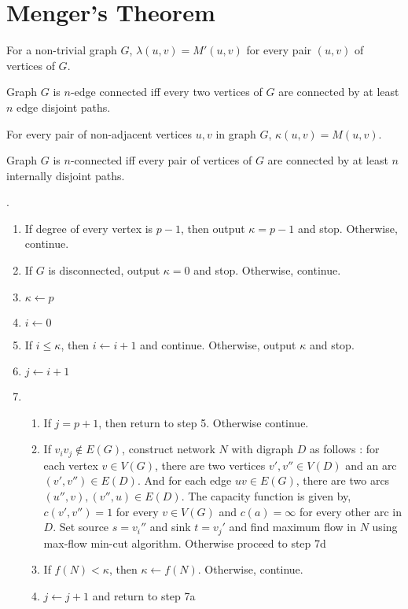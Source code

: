 \section{Menger's Theorem}
\begin{theorem}
	For a non-trivial graph $G$, $\lambda(u,v) = M'(u,v)$ for every pair $(u,v)$ of vertices of $G$.
\end{theorem}
\begin{corollary}
	Graph $G$ is $n$-edge connected iff every two vertices of $G$ are connected by at least $n$ edge disjoint paths.
\end{corollary}

\begin{theorem}
	For every pair of non-adjacent vertices $u,v$ in graph $G$, $\kappa(u,v) = M(u,v)$.
\end{theorem}
\begin{corollary}
	Graph $G$ is $n$-connected iff every pair of vertices of $G$ are connected by at least $n$ internally disjoint paths.
\end{corollary}

\begin{algorithm}.
	\begin{enumerate}
		\item If degree of every vertex is $p-1$, then output $\kappa = p-1$ and stop. Otherwise, continue.
		\item If $G$ is disconnected, output $\kappa = 0$ and stop. Otherwise, continue.
		\item $\kappa \leftarrow p$
		\item $i \leftarrow 0$
		\item If $i \le \kappa$, then $i \leftarrow i+1$ and continue. Otherwise, output $\kappa$ and stop.
		\item $j \leftarrow i+1$
		\item 
			\begin{enumerate}[label=(\arabic*)]
				\item If $j = p+1$, then return to step 5. Otherwise continue.
				\item If $v_iv_j \not\in E(G)$, construct network $N$ with digraph $D$ as follows : for each vertex $ v \in V(G)$, there are two vertices $v',v'' \in V(D)$ and an arc $(v',v'') \in E(D)$. And for each edge $uv \in E(G)$, there are two arcs $(u'',v),(v'',u) \in E(D)$. The capacity function is given by, $c(v',v'') = 1$ for every $v \in V(G)$ and $c(a) = \infty$ for every other arc in $D$. Set source $s = v_i''$ and sink $t = v_j'$ and find maximum flow in $N$ using max-flow min-cut algorithm. Otherwise proceed to step 7d
				\item If $f(N) < \kappa$, then $\kappa \leftarrow f(N)$. Otherwise, continue.
				\item $j \leftarrow j+1$ and return to step 7a
			\end{enumerate}
	\end{enumerate}
\end{algorithm}

